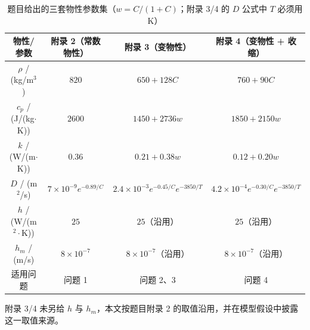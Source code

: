 \begin{table}[htbp]
  \centering
  \caption{题目给出的三套物性参数集（$w = C/(1+C)$；附录 3/4 的 $D$ 公式中 $T$ 必须用 K）}
  \label{tab:property-sets}
  \scriptsize
  \begin{tabular}{cccc}
    \toprule
    物性/参数 & 附录 2（常数物性） & 附录 3（变物性） & 附录 4（变物性 + 收缩） \\
    \midrule
    $\rho$ / (kg/m$^3$) & $820$ & $650+128C$ & $760+90C$ \\
    $c_p$ / (J/(kg$\cdot$K)) & $2600$ & $1450+2736w$ & $1850+2150w$ \\
    $k$ / (W/(m$\cdot$K)) & $0.36$ & $0.21+0.38w$ & $0.12+0.20w$ \\
    $D$ / (m$^2$/s) & $7\times10^{-9}e^{-0.89/C}$ & $2.4\times10^{-3}e^{-0.45/C}e^{-3850/T}$ & $4.2\times10^{-4}e^{-0.30/C}e^{-3850/T}$ \\
    $h$ / (W/(m$^2\cdot$K)) & $25$ & $25$（沿用） & $25$（沿用） \\
    $h_m$ / (m/s) & $8\times10^{-7}$ & $8\times10^{-7}$（沿用） & $8\times10^{-7}$（沿用） \\
    适用问题 & 问题 1 & 问题 2、3 & 问题 4 \\
    \bottomrule
  \end{tabular}
  \par\smallskip\footnotesize 附录 3/4 未另给 $h$ 与 $h_m$，本文按题目附录 2 的取值沿用，并在模型假设中披露这一取值来源。
\end{table}

